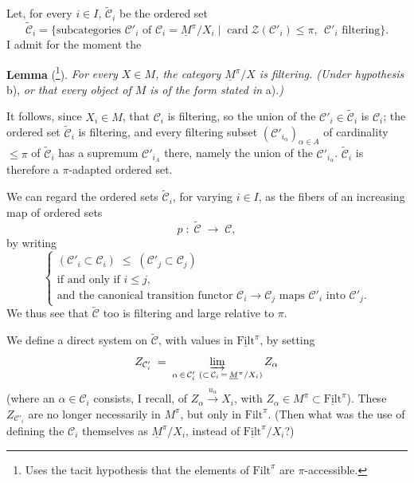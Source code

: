 \documentclass[11pt]{article}
\newcommand{\printedpage}[1]{\marginpar{\footnotesize p.~#1}}
\newcommand{\msp}[1]{\marginpar{\footnotesize [#1]}}
\begin{document}
\printedpage{50}

\msp{page 93}Let, for every $i\in I$, $\tilde{\mathcal{C}}_i$ be the ordered set
\[ \tilde{\mathcal{C}}_i = \{\text{subcategories } \mathcal{C}'_i \text{ of } \mathcal{C}_i = \underline{M}^\pi/X_i \mid \operatorname{card}\mathcal{Z}(\mathcal{C}'_i)\le\pi,\ \ \mathcal{C}'_i \text{ filtering}\}. \]
I admit for the moment the

\textbf{Lemma} (\footnote[44]{Uses the tacit hypothesis that the elements of $\mathrm{Filt}^\pi$ are $\pi$-accessible.}). \textit{For every $X\in M$, the category $\underline{M}^\pi/X$ is filtering. (Under hypothesis} b), \textit{or that every object of $M$ is of the form stated in} a).\textit{)}

It follows, since $X_i\in M$, that $\mathcal{C}_i$ is filtering, so the union of the $\mathcal{C}'_i\in\tilde{\mathcal{C}}_i$ is $\mathcal{C}_i$; the ordered set $\tilde{\mathcal{C}}_i$ is filtering, and every filtering subset $(\mathcal{C}'_{i_\alpha})_{\alpha\in A}$ of cardinality $\le\pi$ of $\tilde{\mathcal{C}}_i$ has a supremum $\mathcal{C}'_{i_A}$ there, namely the union of the $\mathcal{C}'_{i_\alpha}$. $\tilde{\mathcal{C}}_i$ is therefore a $\pi$-adapted ordered set.

We can regard the ordered sets $\tilde{\mathcal{C}}_i$, for varying $i\in I$, as the fibers of an increasing map of ordered sets
\[ p \;:\; \tilde{\mathcal{C}} \;\longrightarrow\; \mathcal{C}, \]
by writing
\[ \left\{ \begin{array}{l}
(\mathcal{C}'_i\subset\mathcal{C}_i) \;\le\; (\mathcal{C}'_j\subset\mathcal{C}_j) \\
\text{if and only if } i\le j, \\
\text{and the canonical transition functor } \mathcal{C}_i\longrightarrow\mathcal{C}_j \text{ maps } \mathcal{C}'_i \text{ into } \mathcal{C}'_j.
\end{array}\right. \]
We thus see that $\tilde{\mathcal{C}}$ too is filtering and large relative to $\pi$.

\msp{page 94}We define a direct system on $\tilde{\mathcal{C}}$, with values in $\underline{\mathrm{Filt}}^\pi$, by setting
\[ Z_{\mathcal{C}'_i} \;=\; \varinjlim_{\alpha\,\in\,\mathcal{C}'_i\ (\subset\,\mathcal{C}_i\,=\,\underline{M}^\pi/X_i)} Z_\alpha \]
(where an $\alpha\in\mathcal{C}_i$ consists, I recall, of $Z_\alpha\xrightarrow{u_\alpha}X_i$, with $Z_\alpha\in M^\pi\subset\underline{\mathrm{Filt}}^\pi$). These $Z_{\mathcal{C}'_i}$ are no longer necessarily in $M^\pi$, but only in $\mathrm{Filt}^\pi$. (Then what was the use of defining the $\mathcal{C}_i$ themselves as $\underline{M}^\pi/X_i$, instead of $\underline{\mathrm{Filt}}^\pi/X_i$?)
\end{document}
